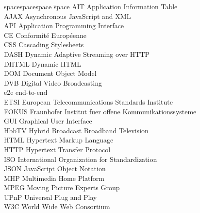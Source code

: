 
\begin{tabbing}
spacespacespace \= space \kill
AIT \> Application Information Table\\
AJAX \> Asynchronous JavaScript and XML\\
API \> Application Programming Interface\\
CE \> Conformité Européenne\\
CSS \> Cascading Stylesheets\\
DASH \> Dynamic Adaptive Streaming over HTTP\\
DHTML \> Dynamic HTML\\
DOM \> Document Object Model\\
DVB \> Digital Video Broadcasting\\
e2e \> end-to-end\\
ETSI \> European Telecommunications Standards Institute\\
FOKUS \> Fraunhofer Institut fuer offene Kommunikationssysteme\\
GUI \> Graphical User Interface\\
HbbTV \> Hybrid Broadcast Broadband Television\\
HTML \> Hypertext Markup Language\\
HTTP \> Hypertext Transfer Protocol\\
ISO \> International Organization for Standardization\\
JSON \> JavaScript Object Notation\\
MHP \> Multimedia Home Platform\\
MPEG \> Moving Picture Experts Group\\
UPnP \> Universal Plug and Play\\
W3C \> World Wide Web Consortium\\
\end{tabbing}
\endinput
